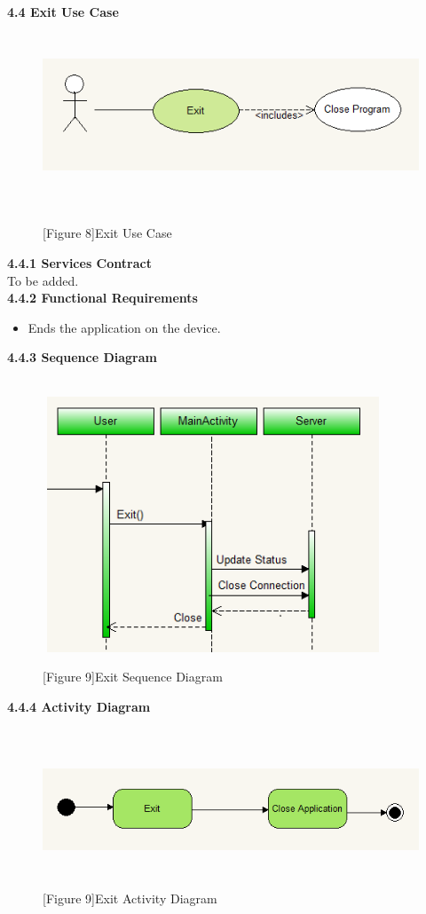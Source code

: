 \documentclass[29pt,a4paper]{moderncv}
\begin{document}
\newpage		
	\left\textbf{4.4 Exit Use Case}
		\begin{figure}
			\centering
			\\ \includegraphics[width=6.0in, height=1.5in]{./exitCase.png}
			\\\caption{[Figure 8]Exit Use Case}\\
		\end{figure}
		
		\noindent\textbf{4.4.1 Services Contract}\\ 
		To be added.\\
		\textbf{4.4.2 Functional Requirements}
			\begin{itemize}
				\item Ends the application on the device.\\
			\end{itemize}
			\newpage
		\left\textbf{4.4.3 Sequence Diagram}
		\begin{figure}
			\centering
			\\ \includegraphics[width=4.0in, height=3.0in]{./exitActivity.png}
			\\\caption{[Figure 9]Exit Sequence Diagram}
		\end{figure}
		
		\newpage
		\left\textbf{4.4.4 Activity Diagram}
				\begin{figure}
					\centering
					\\ \includegraphics[width=5.0in, height=1.5in]{./acExit.png}
					\\\caption{[Figure 9]Exit Activity Diagram}
				\end{figure}
				
\end{document}
